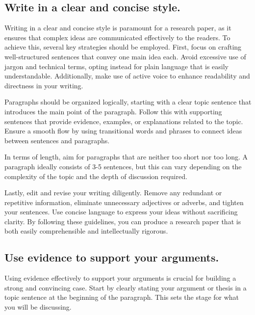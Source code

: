 \documentclass[
  b5paper]{book}
\begin{document}
\hypertarget{write-in-a-clear-and-concise-style.}{%
\subsection*{Write in a clear and concise style.}\label{write-in-a-clear-and-concise-style.}}

Writing in a clear and concise style is paramount for a research paper, as it ensures that complex ideas are communicated effectively to the readers. To achieve this, several key strategies should be employed. First, focus on crafting well-structured sentences that convey one main idea each. Avoid excessive use of jargon and technical terms, opting instead for plain language that is easily understandable. Additionally, make use of active voice to enhance readability and directness in your writing.

Paragraphs should be organized logically, starting with a clear topic sentence that introduces the main point of the paragraph. Follow this with supporting sentences that provide evidence, examples, or explanations related to the topic. Ensure a smooth flow by using transitional words and phrases to connect ideas between sentences and paragraphs.

In terms of length, aim for paragraphs that are neither too short nor too long. A paragraph ideally consists of 3-5 sentences, but this can vary depending on the complexity of the topic and the depth of discussion required.

Lastly, edit and revise your writing diligently. Remove any redundant or repetitive information, eliminate unnecessary adjectives or adverbs, and tighten your sentences. Use concise language to express your ideas without sacrificing clarity. By following these guidelines, you can produce a research paper that is both easily comprehensible and intellectually rigorous.

\hypertarget{use-evidence-to-support-your-arguments.}{%
\subsection*{Use evidence to support your arguments.}\label{use-evidence-to-support-your-arguments.}}

Using evidence effectively to support your arguments is crucial for building a strong and convincing case. Start by clearly stating your argument or thesis in a topic sentence at the beginning of the paragraph. This sets the stage for what you will be discussing.
\end{document}
